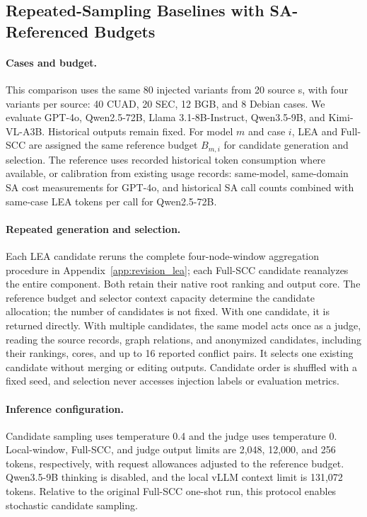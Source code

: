 \begin{revadded}
\subsection{Repeated-Sampling Baselines with SA-Referenced Budgets}
\label{app:equal_budget}

\paragraph{Cases and budget.}
This comparison uses the same 80 injected variants from 20 source \scc{}s, with four variants per source: 40 CUAD, 20 SEC, 12 BGB, and 8 Debian cases. We evaluate GPT-4o, Qwen2.5-72B, Llama 3.1-8B-Instruct, Qwen3.5-9B, and Kimi-VL-A3B. Historical \samcgs{} outputs remain fixed. For model $m$ and case $i$, LEA and Full-SCC are assigned the same reference budget $B_{m,i}$ for candidate generation and selection. The reference uses recorded historical \samcgs{} token consumption where available, or calibration from existing usage records: same-model, same-domain SA cost measurements for GPT-4o, and historical SA call counts combined with same-case LEA tokens per call for Qwen2.5-72B.

\paragraph{Repeated generation and selection.}
Each LEA candidate reruns the complete four-node-window aggregation procedure in Appendix~\ref{app:revision_lea}; each Full-SCC candidate reanalyzes the entire component. Both retain their native root ranking and output core. The reference budget and selector context capacity determine the candidate allocation; the number of candidates is not fixed. With one candidate, it is returned directly. With multiple candidates, the same model acts once as a judge, reading the source records, graph relations, and anonymized candidates, including their rankings, cores, and up to 16 reported conflict pairs. It selects one existing candidate without merging or editing outputs. Candidate order is shuffled with a fixed seed, and selection never accesses injection labels or evaluation metrics.

\paragraph{Inference configuration.}
Candidate sampling uses temperature 0.4 and the judge uses temperature 0. Local-window, Full-SCC, and judge output limits are 2,048, 12,000, and 256 tokens, respectively, with request allowances adjusted to the reference budget. Qwen3.5-9B thinking is disabled, and the local vLLM context limit is 131,072 tokens. Relative to the original Full-SCC one-shot run, this protocol enables stochastic candidate sampling.


\end{revadded}
